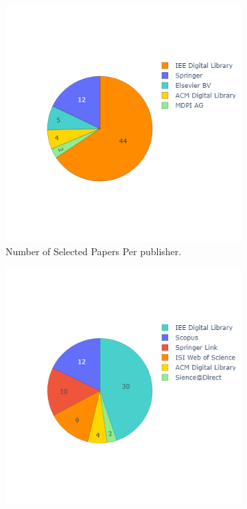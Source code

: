 \begin{figure}[H]    
    \begin{subfigure}[b]{0.48\textwidth}
        \includegraphics[width=\textwidth]{images/newimages/pie-paper-publisher.png}
        \caption{Number of Selected Papers Per publisher.}
    \end{subfigure}
    \begin{subfigure}[b]{0.45\textwidth}
        \includegraphics[width=\textwidth]{images/newimages/pie-paper-source.png}

\end{subfigure}
\end{figure}

